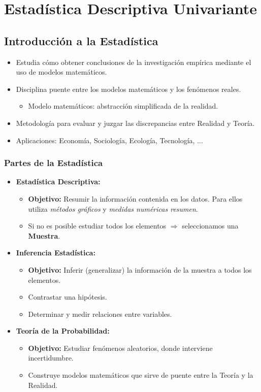 \section{Estadística Descriptiva Univariante}
\subsection{Introducción a la Estadística}
\begin{itemize}
	\item Estudia cómo obtener conclusiones de la investigación empírica mediante el uso de modelos matemáticos.
	\item Disciplina puente entre los modelos matemáticos y los fenómenos reales.
	\begin{itemize}
		\item Modelo matemáticos: abstracción simplificada de la realidad.
	\end{itemize}
	\item Metodología para evaluar y juzgar las discrepancias entre Realidad y Teoría.
	\item Aplicaciones: Economía, Sociología, Ecología, Tecnología, $\hdots$
\end{itemize}
\subsubsection*{Partes de la Estadística}
\begin{itemize}
	\item \textbf{Estadística Descriptiva:}
	\begin{itemize}
		\item \textbf{Objetivo:} Resumir la información contenida en los datos. Para ellos utiliza \textit{métodos gráficos} y \textit{medidas numéricas resumen}.
		\item Si no es posible estudiar todos los elementos $\Longrightarrow$ seleccionamos una \textbf{Muestra}.
	\end{itemize}
	\item \textbf{Inferencia Estadística:}
	\begin{itemize}
		\item \textbf{Objetivo:} Inferir (generalizar) la información de la muestra a todos los elementos.
		\item Contrastar una hipótesis.
		\item Determinar y medir relaciones entre variables.
	\end{itemize}
	\item \textbf{Teoría de la Probabilidad:}
	\begin{itemize}
		\item \textbf{Objetivo:} Estudiar fenómenos aleatorios, donde interviene incertidumbre.
		\item Construye modelos matemáticos que sirve de puente entre la Teoría y la Realidad.
	\end{itemize}
\end{itemize}
